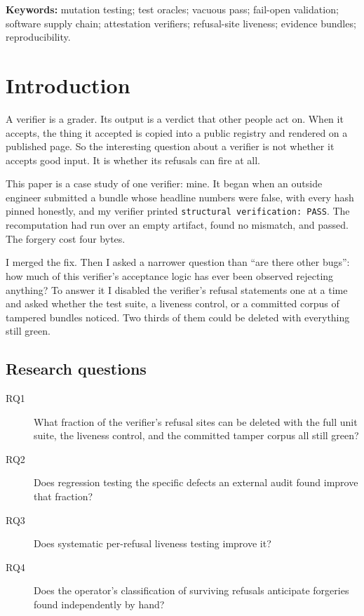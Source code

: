 \documentclass[11pt]{article}
\begin{document}
\noindent\textbf{Keywords:} mutation testing; test oracles; vacuous pass; fail-open
validation; software supply chain; attestation verifiers; refusal-site liveness; evidence
bundles; reproducibility.

\section{Introduction}
\label{sec:intro}

A verifier is a grader. Its output is a verdict that other people act on. When it accepts,
the thing it accepted is copied into a public registry and rendered on a published page.
So the interesting question about a verifier is not whether it accepts good input. It is
whether its refusals can fire at all.

This paper is a case study of one verifier: mine. It began when an outside engineer
submitted a bundle whose headline numbers were false, with every hash pinned honestly, and
my verifier printed \texttt{structural verification: PASS}. The recomputation had run over
an empty artifact, found no mismatch, and passed. The forgery cost four bytes.

I merged the fix. Then I asked a narrower question than ``are there other bugs'': how much
of this verifier's acceptance logic has ever been observed rejecting anything? To answer it
I disabled the verifier's refusal statements one at a time and asked whether the test suite,
a liveness control, or a committed corpus of tampered bundles noticed. Two thirds of them
could be deleted with everything still green.

\subsection*{Research questions}

\begin{description}
\item[RQ1] What fraction of the verifier's refusal sites can be deleted with the full unit
suite, the liveness control, and the committed tamper corpus all still green?
\item[RQ2] Does regression testing the specific defects an external audit found improve
that fraction?
\item[RQ3] Does systematic per-refusal liveness testing improve it?
\item[RQ4] Does the operator's classification of surviving refusals anticipate forgeries
found independently by hand?
\end{description}
\end{document}
